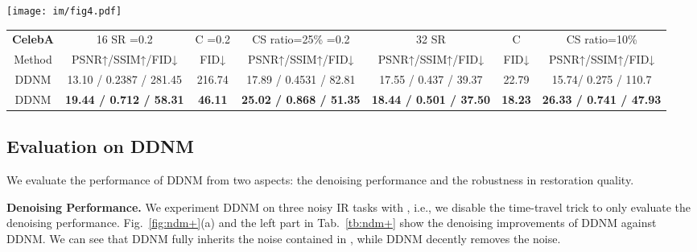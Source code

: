 \documentclass{article} \usepackage{iclr2023_conference,times}
\begin{document}
\begin{figure*}[t]
  \centering
  \vspace{-0.5cm}
  \texttt{[image: im/fig4.pdf]}
  \vspace{-0.5cm}
  \caption{DDNM improves (a) denoising performance and (b) restoration quality.}
\label{fig:ndm+} 
\end{figure*}
\begin{table*}[t]
    \centering
    \scriptsize
    \begin{tabular}{c|ccc|ccc}
        \hline
           \multicolumn{1}{c}{\rule{0pt}{10pt}\textbf{CelebA}}&\multicolumn{1}{|c}{{16 SR =0.2}} &\multicolumn{1}{c}{C =0.2}&\multicolumn{1}{c}{CS ratio=25\% =0.2}&\multicolumn{1}{|c}{{32 SR}} &\multicolumn{1}{c}{C}&\multicolumn{1}{c}{CS ratio=10\%}\\
           \rule{0pt}{10pt}Method& PSNR↑/SSIM↑/FID↓ &  FID↓&  PSNR↑/SSIM↑/FID↓& PSNR↑/SSIM↑/FID↓ &  FID↓&  PSNR↑/SSIM↑/FID↓\\
        \hline
            \rule{0pt}{10pt}{DDNM} &13.10 / 0.2387 / 281.45& 216.74
            &17.89 / 0.4531 / 82.81&17.55 / 0.437 / 39.37&22.79&15.74/ 0.275 / 110.7
            \\   
            \rule{0pt}{10pt}{DDNM} &\textbf{19.44 / 0.712 / 58.31 }& \textbf{46.11}
            &\textbf{25.02 / 0.868 / 51.35} &\textbf{18.44 / 0.501 / 37.50}& \textbf{18.23}&\textbf{26.33 / 0.741 / 47.93}
            \\
        \hline
    \end{tabular}
    \caption{Ablation study on denoising improvements (\textit{left}) and the time-travel trick (\textit{right}). C represents the colorization task.  denotes the noise variance on .
    }
    \vspace{-0.2cm}
    \label{tb:ndm+}
\end{table*}

\vspace{-0.2cm}
\subsection{Evaluation on DDNM}
We evaluate the performance of DDNM from two aspects: the denoising performance and the robustness in restoration quality.

\textbf{Denoising Performance.} We experiment DDNM on three noisy IR tasks with , i.e., we disable the time-travel trick to only evaluate the denoising performance. Fig.~\ref{fig:ndm+}(a) and the left part in Tab.~\ref{tb:ndm+} show the denoising improvements of DDNM against DDNM. We can see that DDNM fully inherits the noise contained in , while DDNM decently removes the noise.
\end{document}
